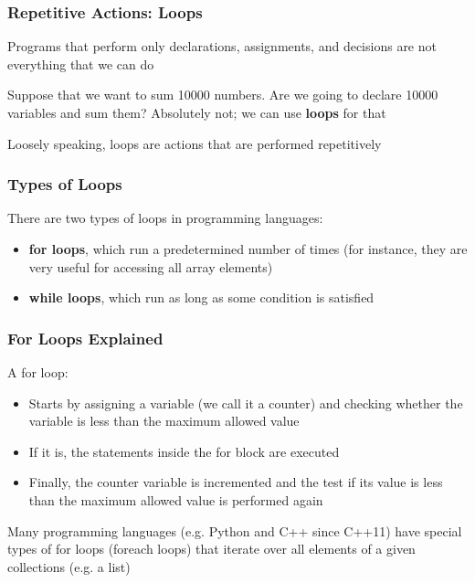 \documentclass{beamer}
\begin{document}
\begin{frame}
\frametitle{Repetitive Actions: Loops}
    Programs that perform only declarations, assignments, and decisions are not everything that we can do
    \newline

    Suppose that we want to sum 10000 numbers. Are we going to declare 10000 variables and sum them? Absolutely not; we can use \textbf{loops} for that
    \newline

    Loosely speaking, loops are actions that are performed repetitively
\end{frame}

\begin{frame}
\frametitle{Types of Loops}
    There are two types of loops in programming languages:
    \begin{itemize}
        \item \textbf{for loops}, which run a predetermined number of times (for instance, they are very useful for accessing all array elements)
        
        \item \textbf{while loops}, which run as long as some condition is satisfied
        
    \end{itemize}
\end{frame}

\begin{frame}
\frametitle{For Loops Explained}
    A for loop:
    \begin{itemize}
        \item Starts by assigning a variable (we call it a counter) and checking whether the variable is less than the maximum allowed value
        \item If it is, the statements inside the for block are executed
        \item Finally, the counter variable is incremented and the test if its value is less than the maximum allowed value is performed again
        \newline
    \end{itemize}
    Many programming languages (e.g. Python and C++ since C++11) have special types of for loops (foreach loops) that iterate over all elements of a given collections (e.g. a list)
\end{frame}
\end{document}
